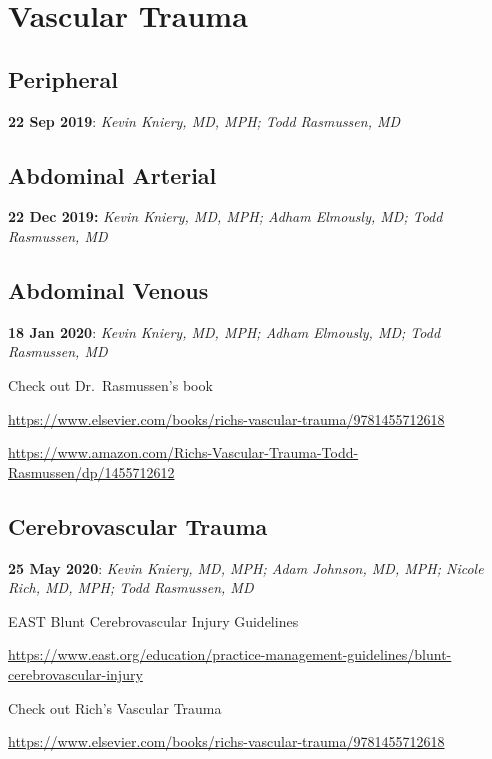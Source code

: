 \documentclass[
]{book}
\begin{document}
\hypertarget{vascular-trauma}{%
\chapter{Vascular Trauma}\label{vascular-trauma}}

\hypertarget{peripheral}{%
\section{Peripheral}\label{peripheral}}

\textbf{22 Sep 2019}: \emph{Kevin Kniery, MD, MPH; Todd Rasmussen, MD}

\hypertarget{abdominal-arterial}{%
\section{Abdominal Arterial}\label{abdominal-arterial}}

\textbf{22 Dec 2019:} \emph{Kevin Kniery, MD, MPH; Adham Elmously, MD; Todd
Rasmussen, MD}

\hypertarget{abdominal-venous}{%
\section{Abdominal Venous}\label{abdominal-venous}}

\textbf{18 Jan 2020}: \emph{Kevin Kniery, MD, MPH; Adham Elmously, MD; Todd
Rasmussen, MD}

Check out Dr.~Rasmussen's book

\url{https://www.elsevier.com/books/richs-vascular-trauma/9781455712618}

\url{https://www.amazon.com/Richs-Vascular-Trauma-Todd-Rasmussen/dp/1455712612}

\hypertarget{cerebrovascular-trauma}{%
\section{Cerebrovascular Trauma}\label{cerebrovascular-trauma}}

\textbf{25 May 2020}: \emph{Kevin Kniery, MD, MPH; Adam Johnson, MD, MPH; Nicole
Rich, MD, MPH; Todd Rasmussen, MD}

EAST Blunt Cerebrovascular Injury Guidelines

\url{https://www.east.org/education/practice-management-guidelines/blunt-cerebrovascular-injury}~

Check out Rich's Vascular Trauma

\url{https://www.elsevier.com/books/richs-vascular-trauma/9781455712618}
\end{document}
